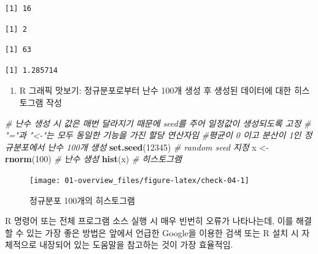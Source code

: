 \documentclass[
  11pt,
]{krantz}
\makeatletter
\newenvironment{Shaded}{\begin{snugshade}}{\end{snugshade}}
\newcommand{\CommentTok}[1]{\textcolor[rgb]{0.37,0.37,0.37}{\textit{#1}}}
\newcommand{\DecValTok}[1]{\textcolor[rgb]{0.06,0.06,0.06}{#1}}
\newcommand{\KeywordTok}[1]{\textcolor[rgb]{0.27,0.27,0.27}{\textbf{#1}}}
\newcommand{\NormalTok}[1]{#1}
\newcommand{\StringTok}[1]{\textcolor[rgb]{0.5,0.5,0.5}{#1}}
\providecommand{\tightlist}{%
  \setlength{\itemsep}{0pt}\setlength{\parskip}{0pt}}
\newenvironment{kframe}{%
\medskip{}
\setlength{\fboxsep}{.8em}
 \def\at@end@of@kframe{}%
 \ifinner\ifhmode%
  \def\at@end@of@kframe{\end{minipage}}%
  \begin{minipage}{\columnwidth}%
 \fi\fi%
 \def\FrameCommand##1{\hskip\@totalleftmargin \hskip-\fboxsep
 \colorbox{shadecolor}{##1}\hskip-\fboxsep
     \hskip-\linewidth \hskip-\@totalleftmargin \hskip\columnwidth}%
 \MakeFramed {\advance\hsize-\width
   \@totalleftmargin\z@ \linewidth\hsize
   \@setminipage}}%
 {\par\unskip\endMakeFramed%
 \at@end@of@kframe}
\newenvironment{rmdblock}[1]
  {
  \begin{itemize}
  \renewcommand{\labelitemi}{
    \raisebox{-.7\height}[0pt][0pt]{
      {\setkeys{Gin}{width=3em,keepaspectratio}\texttt{[image: images/\#1]}}
    }
  }
  \setlength{\fboxsep}{1em}
  \begin{kframe}
  \item
  }
  {
  \end{kframe}
  \end{itemize}
  }
\newenvironment{rmdtip}
  {\begin{rmdblock}{tip}}
  {\end{rmdblock}}
\makeatother
\begin{document}
\begin{verbatim}
[1] 16
\end{verbatim}

\begin{verbatim}
[1] 2
\end{verbatim}

\begin{verbatim}
[1] 63
\end{verbatim}

\begin{verbatim}
[1] 1.285714
\end{verbatim}

\normalsize

\begin{enumerate}
\def\labelenumi{\arabic{enumi}.}
\setcounter{enumi}{4}
\tightlist
\item
  R 그래픽 맛보기: 정규분포로부터 난수 100개 생성 후 생성된 데이터에 대한 히스토그램 작성
\end{enumerate}

\footnotesize

\begin{Shaded}
\begin{Highlighting}[]
\CommentTok{# 난수 생성 시 값은 매번 달라지기 때문에 seed를 주어 일정값이 생성되도록 고정}
\CommentTok{# "="과 "<-"는 모두 동일한 기능을 가진 할당 연산자임}
\CommentTok{#평균이 0 이고 분산이 1인 정규분포에서 난수 100개 생성}
\KeywordTok{set.seed}\NormalTok{(}\DecValTok{12345}\NormalTok{) }\CommentTok{# random seed 지정}
\NormalTok{x <-}\StringTok{ }\KeywordTok{rnorm}\NormalTok{(}\DecValTok{100}\NormalTok{) }\CommentTok{# 난수 생성}
\KeywordTok{hist}\NormalTok{(x) }\CommentTok{# 히스토그램}
\end{Highlighting}
\end{Shaded}

\begin{figure}

{\centering \texttt{[image: 01-overview\_files/figure-latex/check-04-1]} 

}

\caption{정규분포 100개의 히스토그램}\label{fig:check-04}
\end{figure}

\normalsize

\footnotesize

\begin{rmdtip}
\begin{rmdtip}

R 명령어 또는 전체 프로그램 소스 실행 시 매우 빈번히 오류가 나타나는데, 이를 해결할 수 있는 가장 좋은 방법은 앞에서 언급한 Google을 이용한 검색 또는 R 설치 시 자체적으로 내장되어 있는 도움말을 참고하는 것이 가장 효율적임.

\end{rmdtip}
\end{rmdtip}
\end{document}
